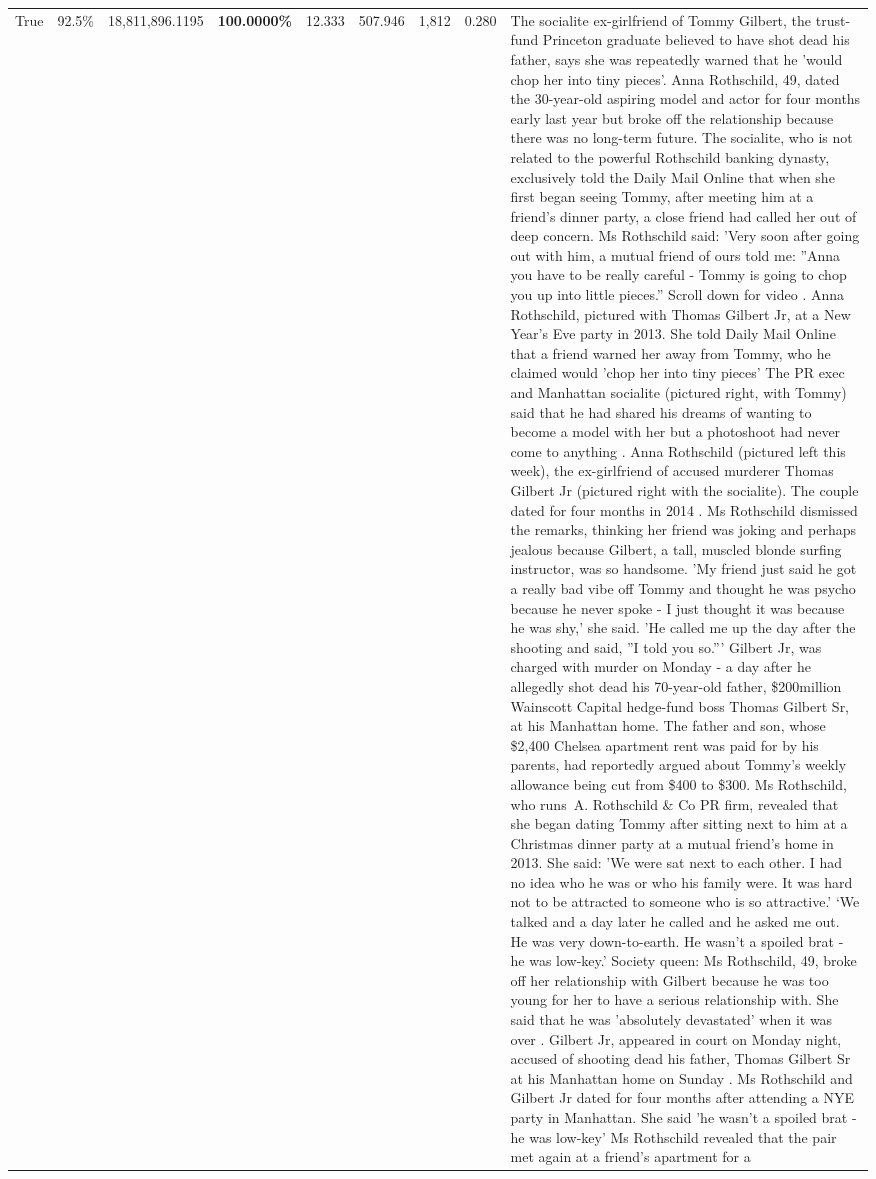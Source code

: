 \begin{table}[H]
\begin{tabular}{lllrlllll}
True & 92.5\% & 18,811,896.1195 & \bfseries \color{red} 100.0000\% & 12.333 & 507.946 & 1,812 & 0.280 & The socialite ex-girlfriend of Tommy Gilbert, the trust-fund Princeton graduate believed to have shot dead his father, says she was repeatedly warned that he 'would chop her into tiny pieces'. Anna Rothschild, 49, dated the 30-year-old aspiring model and actor for four months early last year but broke off the relationship because there was no long-term future. The socialite, who is not related to the powerful Rothschild banking dynasty, exclusively told the Daily Mail Online that when she first began seeing Tommy, after meeting him at a friend's dinner party, a close friend had called her out of deep concern. Ms Rothschild said: 'Very soon after going out with him, a mutual friend of ours told me: ''Anna you have to be really careful - Tommy is going to chop you up into little pieces.'' Scroll down for video . Anna Rothschild, pictured with Thomas Gilbert Jr, at a New Year's Eve party in 2013. She told Daily Mail Online that a friend warned her away from Tommy, who he claimed would 'chop her into tiny pieces' The PR exec and Manhattan socialite (pictured right, with Tommy) said that he had shared his dreams of wanting to become a model with her but a photoshoot had never come to anything . Anna Rothschild (pictured left this week), the ex-girlfriend of accused murderer Thomas Gilbert Jr (pictured right with the socialite). The couple dated for four months in 2014 . Ms Rothschild dismissed the remarks, thinking her friend was joking and perhaps jealous because Gilbert, a tall, muscled blonde surfing instructor, was so handsome. 'My friend just said he got a really bad vibe off Tommy and thought he was psycho because he never spoke - I just thought it was because he was shy,' she said. 'He called me up the day after the shooting and said, ''I told you so.''' Gilbert Jr, was charged with murder on Monday - a day after he allegedly shot dead his 70-year-old father, \$200million Wainscott Capital hedge-fund boss Thomas Gilbert Sr, at his Manhattan home. The father and son, whose \$2,400 Chelsea apartment rent was paid for by his parents, had reportedly argued about Tommy's weekly allowance being cut from \$400 to \$300. Ms Rothschild, who runs A. Rothschild \& Co PR firm, revealed that she began dating Tommy after sitting next to him at a Christmas dinner party at a mutual friend's home in 2013. She said: 'We were sat next to each other. I had no idea who he was or who his family were. It was hard not to be attracted to someone who is so attractive.' ‘We talked and a day later he called and he asked me out. He was very down-to-earth. He wasn’t a spoiled brat - he was low-key.’ Society queen: Ms Rothschild, 49, broke off her relationship with Gilbert because he was too young for her to have a serious relationship with. She said that he was 'absolutely devastated' when it was over . Gilbert Jr, appeared in court on Monday night, accused of shooting dead his father, Thomas Gilbert Sr at his Manhattan home on Sunday . Ms Rothschild and Gilbert Jr dated for four months after attending a NYE party in Manhattan. She said 'he wasn't a spoiled brat - he was low-key' Ms Rothschild revealed that the pair met again at a friend’s apartment for a 
\end{tabular}
\end{table}
